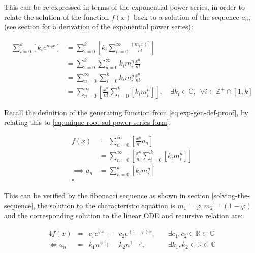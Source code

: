 \documentclass[11pt]{article}
\begin{document}
\begin{enumerate}
\begin{enumerate}
This can be re-expressed in terms of the exponential power series, in order to relate the solution of the function \(f{\left({ x }\right)}\) back to a solution of the sequence \(a_n\), (see section for a derivation of the exponential power series):

\begin{align}
    \sum^{k}_{i= 0}   {\left[{ k_i e^{m_i x}  }\right]}  &= \sum^{k}_{i= 0}   {\left[{ k_i \sum^{\infty}_{n= 0}   \frac{{\left({ m_i x }\right)}^n}{n!}  }\right]}  \nonumber \\
							 &= \sum^{k}_{i= 0}  \sum^{\infty}_{n= 0}   k_i m_i^n \frac{x^n}{n!} \nonumber\\
							 &=    \sum^{\infty}_{n= 0} \sum^{k}_{i= 0}   k_i m_i^n \frac{x^n}{n!} \nonumber \\
							 &= \sum^{\infty}_{n= 0} {\left[{ \frac{x^n}{n!}  \sum^{k}_{i=0}   {\left[{ k_im^n_i }\right]}  }\right]}, \quad \exists k_i \in \mathbb{C}, \enspace \forall i \in \mathbb{Z}^+\cap {\left[{ 1, k }\right]}     \label{eq:unique-root-sol-power-series-form}
\end{align}

Recall the definition of the generating function from \ref{eq:exp-gen-def-proof}, by relating this to \eqref{eq:unique-root-sol-power-series-form}:

\begin{align}
    f{\left({ x }\right)} &= \sum^{\infty}_{n= 0}   {\left[{  \frac{x^n}{n!} a_n }\right]} \nonumber \\
&= \sum^{\infty}_{n= 0} {\left[{ \frac{x^n}{n!}  \sum^{k}_{i=0}   {\left[{ k_im^n_i }\right]}  }\right]}  \nonumber \\
      \implies  a_n &= \sum^{k}_{n= 0} {\left[{ k_im_i^n }\right]}     \nonumber \\ \nonumber
\square
\end{align}

This can be verified by the fibonacci sequence as shown in section \ref{solving-the-sequence}, the solution to the characteristic equation is \(m_1 = \varphi, m_2 = {\left({ 1-\varphi }\right)}\) and the corresponding solution to the linear ODE and recursive relation are:

\begin{alignat}{4}
    f{\left({ x }\right)} &= &c_1 e^{\varphi x} +  &c_2 e^{{\left({ 1-\varphi }\right)} x}, \quad &\exists c_1, c_2 \in \mathbb{R} \subset \mathbb{C} \nonumber \\
    \iff  a_n &= &k_1 n^{\varphi} +  &k_2 n^{1- \varphi}, &\exists k_1, k_2 \in \mathbb{R} \subset \mathbb{C} \nonumber
\end{alignat}
\end{enumerate}


\end{enumerate}
\end{document}
